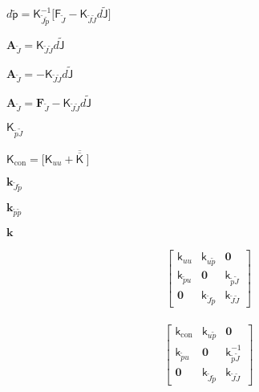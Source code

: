 \documentclass{article}
\begin{document}
$ d \widetilde{\mathbf{\mathsf{p}}} = \mathbf{\mathsf{K}}_{\widetilde{J}\widetilde{p}}^{-1} \bigl[ \mathbf{\mathsf{F}}_{\widetilde{J}} - \mathbf{\mathsf{K}}_{\widetilde{J}\widetilde{J}} d \widetilde{\mathbf{\mathsf{J}}} \bigr] $
\pagebreak

$ \mathsf{\mathbf{A}}_{\widetilde{J}} = \mathbf{\mathsf{K}}_{\widetilde{J}\widetilde{J}} d \widetilde{\mathbf{\mathsf{J}}} $
\pagebreak

$ \mathsf{\mathbf{A}}_{\widetilde{J}} = -\mathbf{\mathsf{K}}_{\widetilde{J}\widetilde{J}} d \widetilde{\mathbf{\mathsf{J}}} $
\pagebreak

$ \mathsf{\mathbf{A}}_{\widetilde{J}} = \mathsf{\mathbf{F}}_{\widetilde{J}} - \mathbf{\mathsf{K}}_{\widetilde{J}\widetilde{J}} d \widetilde{\mathbf{\mathsf{J}}} $
\pagebreak

$ \mathbf{\mathsf{K}}_{\widetilde{p}\widetilde{J}}$
\pagebreak

$ \mathbf{\mathsf{K}}_{\textrm{con}} = \bigl[ \mathbf{\mathsf{K}}_{uu} + \overline{\overline{\mathbf{\mathsf{K}}}}~ \bigr] $
\pagebreak

$\mathsf{\mathbf{k}}_{\widetilde{J} \widetilde{p}}$
\pagebreak

$\mathsf{\mathbf{k}}_{\widetilde{p} \widetilde{p}}$
\pagebreak

$\mathsf{\mathbf{k}}$
\pagebreak

\begin{align*} \begin{bmatrix} \mathbf{\mathsf{k}}_{uu} & \mathbf{\mathsf{k}}_{u\widetilde{p}} & \mathbf{0} \\ \mathbf{\mathsf{k}}_{\widetilde{p}u} & \mathbf{0} & \mathbf{\mathsf{k}}_{\widetilde{p}\widetilde{J}} \\ \mathbf{0} & \mathbf{\mathsf{k}}_{\widetilde{J}\widetilde{p}} & \mathbf{\mathsf{k}}_{\widetilde{J}\widetilde{J}} \end{bmatrix} \end{align*}
\pagebreak

\begin{align*} \begin{bmatrix} \mathbf{\mathsf{k}}_{\textrm{con}} & \mathbf{\mathsf{k}}_{u\widetilde{p}} & \mathbf{0} \\ \mathbf{\mathsf{k}}_{\widetilde{p}u} & \mathbf{0} & \mathbf{\mathsf{k}}_{\widetilde{p}\widetilde{J}}^{-1} \\ \mathbf{0} & \mathbf{\mathsf{k}}_{\widetilde{J}\widetilde{p}} & \mathbf{\mathsf{k}}_{\widetilde{J}\widetilde{J}} \end{bmatrix} \end{align*}
\pagebreak
\end{document}
